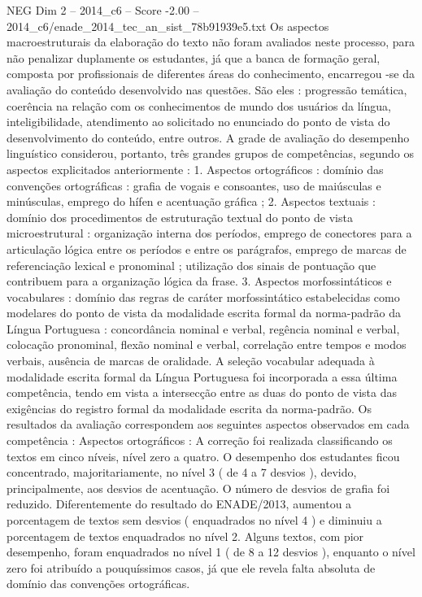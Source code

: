 \begin{textsample}{NEG Dim 2 – 2014\_c6 – Score -2.00 – 2014\_c6/enade\_2014\_tec\_an\_sist\_78b91939e5.txt}
Os aspectos macroestruturais da elaboração do texto não foram avaliados neste processo, para não penalizar duplamente os estudantes, já que a banca de formação geral, composta por profissionais de diferentes áreas do conhecimento, encarregou -se da avaliação do conteúdo desenvolvido nas questões.
São eles : progressão temática, coerência na relação com os conhecimentos de mundo dos usuários da língua, inteligibilidade, atendimento ao solicitado no enunciado do ponto de vista do desenvolvimento do conteúdo, entre outros.
A grade de avaliação do desempenho linguístico considerou, portanto, três grandes grupos de competências, segundo os aspectos explicitados anteriormente : 1.
Aspectos ortográficos : domínio das convenções ortográficas : grafia de vogais e consoantes, uso de maiúsculas e minúsculas, emprego do hífen e acentuação gráfica ; 2.
Aspectos textuais : domínio dos procedimentos de estruturação textual do ponto de vista microestrutural : organização interna dos períodos, emprego de conectores para a articulação lógica entre os períodos e entre os parágrafos, emprego de marcas de referenciação lexical e pronominal ; utilização dos sinais de pontuação que contribuem para a organização lógica da frase. 3.
Aspectos morfossintáticos e vocabulares : domínio das regras de caráter morfossintático estabelecidas como modelares do ponto de vista da modalidade escrita formal da norma-padrão da Língua Portuguesa : concordância nominal e verbal, regência nominal e verbal, colocação pronominal, flexão nominal e verbal, correlação entre tempos e modos verbais, ausência de marcas de oralidade.
A seleção vocabular adequada à modalidade escrita formal da Língua Portuguesa foi incorporada a essa última competência, tendo em vista a intersecção entre as duas do ponto de vista das exigências do registro formal da modalidade escrita da norma-padrão.
Os resultados da avaliação correspondem aos seguintes aspectos observados em cada competência : Aspectos ortográficos : A correção foi realizada classificando os textos em cinco níveis, nível zero a quatro.
O desempenho dos estudantes ficou concentrado, majoritariamente, no nível 3 ( de 4 a 7 desvios ), devido, principalmente, aos desvios de acentuação.
O número de desvios de grafia foi reduzido.
Diferentemente do resultado do ENADE/2013, aumentou a porcentagem de textos sem desvios ( enquadrados no nível 4 ) e diminuiu a porcentagem de textos enquadrados no nível 2.
Alguns textos, com pior desempenho, foram enquadrados no nível 1 ( de 8 a 12 desvios ), enquanto o nível zero foi atribuído a pouquíssimos casos, já que ele revela falta absoluta de domínio das convenções ortográficas.

\end{textsample}
